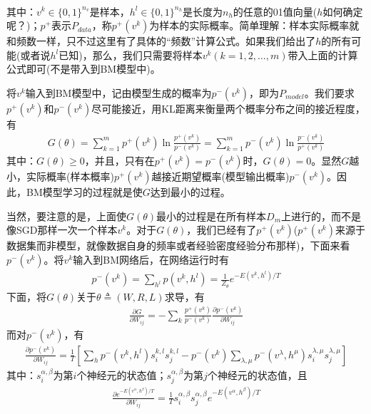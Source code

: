 {\begin{align*}
            \end{align*}
            其中：$v^k\in \{0,1\}^{n_v}$是样本，$h^l\in \{0,1\}^{n_h}$是长度为$n_h$的任意的01值向量($h$如何确定呢？)；$p^+$表示$P_{data}$，称$p^+(v^k)$为样本的实际概率。简单理解：样本实际概率就和频数一样，只不过这里有了具体的“频数”计算公式。如果我们给出了$h$的所有可能(或者说$h^l$已知)，那么，我们只需要将样本$v^k(k=1,2,\dots,m)$带入上面的计算公式即可(不是带入到BM模型中)。
            \par
            将$v^k$输入到BM模型中，记由模型生成的概率为$p^{-}(v^k)$，即为$P_{model}$。我们要求$p^+(v^k)$和$p^-(v^k)$尽可能接近，用KL距离来衡量两个概率分布之间的接近程度，有
            \begin{align*}
            G(\theta) = \sum_{k=1}^m p^+(v^k) \ln \frac{p^+(v^k)}{p^-(v^k)} = \sum_{k=1}^m p^-(v^k)\ln \frac{p^-(v^k)}{p^+(v^k)}
            \end{align*}
            其中：$G(\theta) \geqslant 0$，并且，只有在$p^+(v^k) = p^-(v^k)$时，$G(\theta) = 0$。显然$G$越小，实际概率(样本概率)$p^+(v^k)$越接近期望概率(模型输出概率)$p^-(v^k)$。因此，BM模型学习的过程就是使$G$达到最小的过程。
            \par
            当然，要注意的是，上面使$G(\theta)$最小的过程是在所有样本$D_m$上进行的，而不是像SGD那样一次一个样本$v^k$。对于$G(\theta)$，我们已经有了$p^+(v^k)$($p^+(v^k)$来源于数据集而非模型，就像数据自身的频率或者经验密度经验分布那样)，下面来看$p^-(v^k)$。将$v^k$输入到BM网络后，在网络运行时有
            \begin{align*}
            p^-(v^k) = \sum_{h^l}p(v^k,h^l) = \frac{1}{Z_\theta} e^{-E(v^k,h^l)/T}
            \end{align*}
            下面，将$G(\theta)$关于$\theta\triangleq (W,R,L)$求导，有
            \begin{align*}
            \frac{\partial G}{\partial W_{ij}} = -\sum_k \frac{p^+(v^k)}{p^-(v^k)}\frac{\partial p^-(v^k)}{\partial W_{ij}}
            \end{align*}
            而对$p^-(v^k)$，有
            \begin{align*}
            \frac{\partial p^-(v^k)}{\partial W_{ij}} = \frac{1}{T} \left[ \sum_h p^-(v^k,h^l)s_i^{k,l} s_j^{k,l} - p^-(v^k)\sum_{\lambda,\mu}p^-(v^\lambda,h^\mu)s_i^{\lambda,\mu}s_j^{\lambda,\mu} \right]
            \end{align*}
            其中：$s_i^{\alpha,\beta}$为第$i$个神经元的状态值；$s_j^{\alpha,\beta}$为第$j$个神经元的状态值，且
            \begin{align*}
            \frac{\partial e^{-E(v^\alpha,h^\beta)/T}}{\partial W_{ij}} = \frac{1}{T}s_i^{\alpha,\beta}s_j^{\alpha,\beta}e^{-E(v^\alpha,h^\beta)/T}

\end{align*}}
